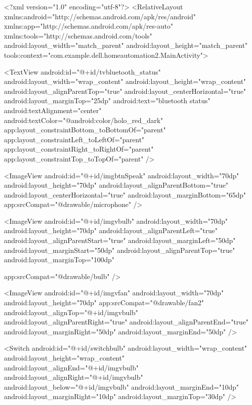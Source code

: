 <?xml version="1.0" encoding="utf-8"?>
<RelativeLayout xmlns:android="http://schemas.android.com/apk/res/android"
    xmlns:app="http://schemas.android.com/apk/res-auto"
    xmlns:tools="http://schemas.android.com/tools"
    android:layout_width="match_parent"
    android:layout_height="match_parent"
    tools:context="com.example.dell.homeautomation2.MainActivity">

    <TextView
        android:id="@+id/tvbluetooth_status"
        android:layout_width="wrap_content"
        android:layout_height="wrap_content"
        android:layout_alignParentTop="true"
        android:layout_centerHorizontal="true"
        android:layout_marginTop="25dp"
        android:text="bluetooth status"
        android:textAlignment="center"
        android:textColor="@android:color/holo_red_dark"
        app:layout_constraintBottom_toBottomOf="parent"
        app:layout_constraintLeft_toLeftOf="parent"
        app:layout_constraintRight_toRightOf="parent"
        app:layout_constraintTop_toTopOf="parent" />

    <ImageView
        android:id="@+id/imgbtnSpeak"
        android:layout_width="70dp"
        android:layout_height="70dp"
        android:layout_alignParentBottom="true"
        android:layout_centerHorizontal="true"
        android:layout_marginBottom="65dp"
        app:srcCompat="@drawable/microphone" />

    <ImageView
        android:id="@+id/imgvbulb"
        android:layout_width="70dp"
        android:layout_height="70dp"
        android:layout_alignParentLeft="true"
        android:layout_alignParentStart="true"
        android:layout_marginLeft="50dp"
        android:layout_marginStart="50dp"
        android:layout_alignParentTop="true"
        android:layout_marginTop="100dp"

        app:srcCompat="@drawable/bulb" />

    <ImageView
        android:id="@+id/imgvfan"
        android:layout_width="70dp"
        android:layout_height="70dp"
        app:srcCompat="@drawable/fan2"
        android:layout_alignTop="@+id/imgvbulb"
        android:layout_alignParentRight="true"
        android:layout_alignParentEnd="true"
        android:layout_marginRight="50dp"
        android:layout_marginEnd="50dp" />

    <Switch
        android:id="@+id/switchbulb"
        android:layout_width="wrap_content"
        android:layout_height="wrap_content"
        android:layout_alignEnd="@+id/imgvbulb"
        android:layout_alignRight="@+id/imgvbulb"
        android:layout_below="@+id/imgvbulb"
        android:layout_marginEnd="10dp"
        android:layout_marginRight="10dp"
        android:layout_marginTop="30dp" />

